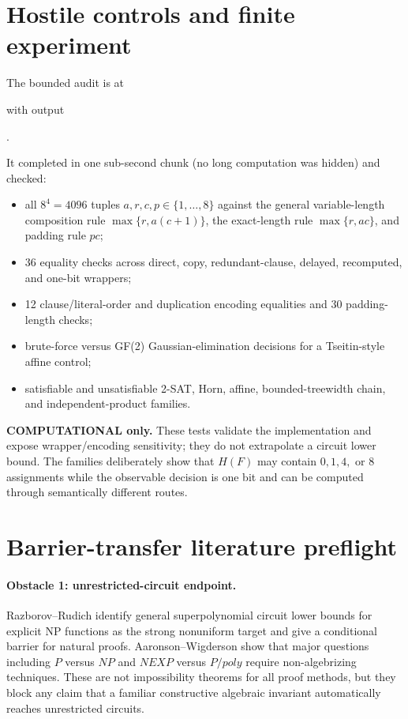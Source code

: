 \documentclass[11pt]{article}
\begin{document}
\section*{Hostile controls and finite experiment}

The bounded audit is at
\begin{center}
\end{center}
with output
\begin{center}
.
\end{center}
It completed in one sub-second chunk (no long computation was hidden) and checked:
\begin{itemize}
  \item all \(8^4=4096\) tuples \(a,r,c,p\in\{1,\ldots,8\}\) against the general variable-length composition rule \(\max\{r,a(c+1)\}\), the exact-length rule \(\max\{r,ac\}\), and padding rule \(pc\);
  \item 36 equality checks across direct, copy, redundant-clause, delayed, recomputed, and one-bit wrappers;
  \item 12 clause/literal-order and duplication encoding equalities and 30 padding-length checks;
  \item brute-force versus GF(2) Gaussian-elimination decisions for a Tseitin-style affine control;
  \item satisfiable and unsatisfiable 2-SAT, Horn, affine, bounded-treewidth chain, and independent-product families.
\end{itemize}

\noindent\textbf{COMPUTATIONAL only.}  These tests validate the implementation and expose wrapper/encoding sensitivity; they do not extrapolate a circuit lower bound.  The families deliberately show that \(H(F)\) may contain \(0,1,4,\) or \(8\) assignments while the observable decision is one bit and can be computed through semantically different routes.

\section*{Barrier-transfer literature preflight}

\paragraph{Obstacle 1: unrestricted-circuit endpoint.}
Razborov--Rudich identify general superpolynomial circuit lower bounds for explicit NP functions as the strong nonuniform target and give a conditional barrier for natural proofs.  Aaronson--Wigderson show that major questions including \(P\) versus \(NP\) and \(NEXP\) versus \(P/poly\) require non-algebrizing techniques.  These are not impossibility theorems for all proof methods, but they block any claim that a familiar constructive algebraic invariant automatically reaches unrestricted circuits.
\end{document}
